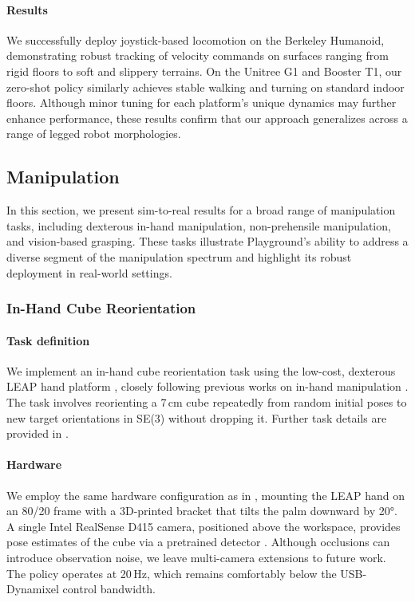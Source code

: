 \paragraph{Results} We successfully deploy joystick-based locomotion on the Berkeley Humanoid, demonstrating robust tracking of velocity commands on surfaces ranging from rigid floors to soft and slippery terrains. On the Unitree G1 and Booster T1, our zero-shot policy similarly achieves stable walking and turning on standard indoor floors. Although minor tuning for each platform’s unique dynamics may further enhance performance, these results confirm that our approach generalizes across a range of legged robot morphologies.

\subsection{Manipulation}
\label{sec:results_sim2real_manipulation}

In this section, we present sim-to-real results for a broad range of manipulation tasks, including dexterous in-hand manipulation, non-prehensile manipulation, and vision-based grasping. These tasks illustrate Playground's ability to address a diverse segment of the manipulation spectrum and highlight its robust deployment in real-world settings.

\subsubsection{In-Hand Cube Reorientation}
\label{sec:in_hand_cube_reorientation}

\paragraph{Task definition} We implement an in-hand cube reorientation task using the low-cost, dexterous LEAP hand platform \cite{shaw2023leaphand}, closely following previous works on in-hand manipulation \cite{handa2023dextreme, andrychowicz2020learning}. The task involves reorienting a 7\,cm cube repeatedly from random initial poses to new target orientations in SE(3) without dropping it. Further task details are provided in .

\paragraph{Hardware} We employ the same hardware configuration as in \cite{li2024_drop}, mounting the LEAP hand on an 80/20 frame with a 3D-printed bracket that tilts the palm downward by 20°. A single Intel RealSense D415 camera, positioned above the workspace, provides pose estimates of the cube via a pretrained detector \cite{handa2023dextreme}. Although occlusions can introduce observation noise, we leave multi-camera extensions to future work. The policy operates at 20\,Hz, which remains comfortably below the USB-Dynamixel control bandwidth.

